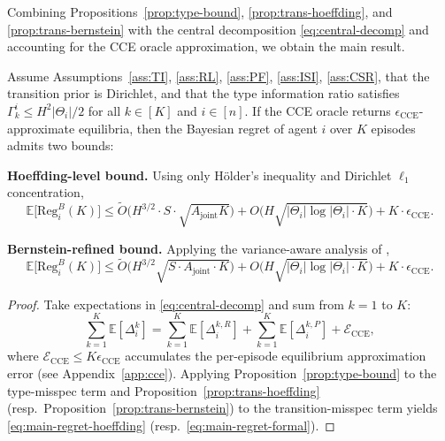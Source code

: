 Combining Propositions~\ref{prop:type-bound}, \ref{prop:trans-hoeffding}, and \ref{prop:trans-bernstein} with the central decomposition \eqref{eq:central-decomp} and accounting for the CCE oracle approximation, we obtain the main result.

\begin{theorem}
\label{thm:main-regret}
Assume Assumptions~\ref{ass:TI}, \ref{ass:RL}, \ref{ass:PF}, \ref{ass:ISI}, \ref{ass:CSR}, that the transition prior is Dirichlet, and that the type information ratio satisfies $\Gamma_k^i \leq H^2 |\Theta_i|/2$ for all $k \in [K]$ and $i \in [n]$. If the CCE oracle returns $\epsilon_{\mathrm{CCE}}$-approximate equilibria, then the Bayesian regret of agent $i$ over $K$ episodes admits two bounds:

\textbf{Hoeffding-level bound.} Using only Hölder's inequality and Dirichlet $\ell_1$ concentration,
\begin{equation}
\label{eq:main-regret-hoeffding}
\mathbb{E}\big[\mathrm{Reg}_i^B(K)\big] \leq \tilde{O}\Big(H^{3/2} \cdot S \cdot \sqrt{A_{\mathrm{joint}} K}\Big) + O\Big(H \sqrt{|\Theta_i| \log|\Theta_i| \cdot K}\Big) + K \cdot \epsilon_{\mathrm{CCE}}.
\end{equation}

\textbf{Bernstein-refined bound.} Applying the variance-aware analysis of \citet{lu2019information,azar2017minimax},
\begin{equation}
\label{eq:main-regret-formal}
\mathbb{E}\big[\mathrm{Reg}_i^B(K)\big] \leq \tilde{O}\Big(H^{3/2}\sqrt{S \cdot A_{\mathrm{joint}} \cdot K}\Big) + O\Big(H \sqrt{|\Theta_i| \log|\Theta_i| \cdot K}\Big) + K \cdot \epsilon_{\mathrm{CCE}}.
\end{equation}
\end{theorem}

\begin{proof}
Take expectations in \eqref{eq:central-decomp} and sum from $k=1$ to $K$:
\begin{equation}
\sum_{k=1}^K \mathbb{E}[\Delta_i^k] = \sum_{k=1}^K \mathbb{E}[\Delta_i^{k,R}] + \sum_{k=1}^K \mathbb{E}[\Delta_i^{k,P}] + \mathcal{E}_{\mathrm{CCE}},
\end{equation}
where $\mathcal{E}_{\mathrm{CCE}} \leq K \epsilon_{\mathrm{CCE}}$ accumulates the per-episode equilibrium approximation error (see Appendix~\ref{app:cce}). Applying Proposition~\ref{prop:type-bound} to the type-misspec term and Proposition~\ref{prop:trans-hoeffding} (resp.\ Proposition~\ref{prop:trans-bernstein}) to the transition-misspec term yields \eqref{eq:main-regret-hoeffding} (resp.\ \eqref{eq:main-regret-formal}).
\end{proof}

